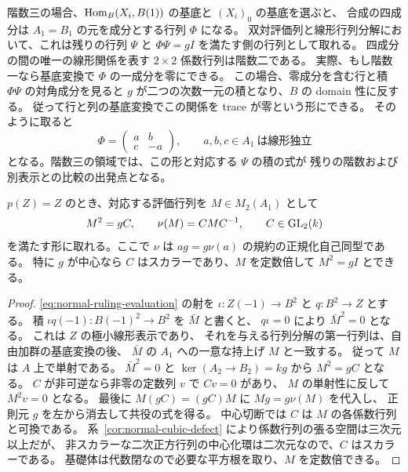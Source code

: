 \begin{remark}[階数三の行列表示]
\label{rem:rank-three-matrix}
階数三の場合、$\operatorname{Hom}_B(X_i,B(1))$ の基底と $(X_i)_0$ の基底を選ぶと、
合成の四成分は $A_1=B_1$ の元を成分とする行列 $\Phi$ になる。
双対評価列と線形行列分解において、これは残りの行列 $\Psi$ と
$\Phi\Psi=gI$ を満たす側の行列として取れる。
四成分の間の唯一の線形関係を表す $2\times2$ 係数行列は階数二である。
実際、もし階数一なら基底変換で $\Phi$ の一成分を零にできる。
この場合、零成分を含む行と積 $\Phi\Psi$ の対角成分を見ると
$g$ が二つの次数一元の積となり、$B$ の domain 性に反する。
従って行と列の基底変換でこの関係を trace が零という形にできる。
そのように取ると
\[
 \Phi=\begin{pmatrix} a&b\\ c&-a\end{pmatrix},
 \qquad a,b,c\in A_1\ \text{は線形独立}
\]
となる。階数三の領域では、この形と対応する $\Psi$ の積の式が
残りの階数および別表示との比較の出発点となる。
\end{remark}

\begin{corollary}
\label{cor:nonstandard-square-matrix}
$p(Z)=Z$ のとき、対応する評価行列を $M\in M_2(A_1)$ として
\[
 M^2=gC,\qquad \nu(M)=CMC^{-1},\qquad C\in\operatorname{GL}_2(k)
\]
を満たす形に取れる。ここで $\nu$ は $ag=g\nu(a)$ の規約の正規化自己同型である。
特に $g$ が中心なら $C$ はスカラーであり、$M$ を定数倍して $M^2=gI$ とできる。
\end{corollary}
\begin{proof}
\eqref{eq:normal-ruling-evaluation} の射を
$\iota:Z(-1)\to B^2$ と $q:B^2\to Z$ とする。
積 $\iota q(-1):B(-1)^2\to B^2$ を $\bar M$ と書くと、
$q\iota=0$ により $\bar M^2=0$ となる。
これは $Z$ の極小線形表示であり、
それを与える行列分解の第一行列は、自由加群の基底変換の後、
$\bar M$ の $A_1$ への一意な持上げ $M$ と一致する。
従って $M$ は $A$ 上で単射である。
$\bar M^2=0$ と $\ker(A_2\to B_2)=kg$ から $M^2=gC$ となる。
$C$ が非可逆なら非零の定数列 $v$ で $Cv=0$ があり、
$M$ の単射性に反して $M^2v=0$ となる。
最後に $M(gC)=(gC)M$ に $Mg=g\nu(M)$ を代入し、
正則元 $g$ を左から消去して共役の式を得る。
中心切断では $C$ は $M$ の各係数行列と可換である。
系~\ref{cor:normal-cubic-defect} により係数行列の張る空間は三次元以上だが、
非スカラーな二次正方行列の中心化環は二次元なので、$C$ はスカラーである。
基礎体は代数閉なので必要な平方根を取り、$M$ を定数倍できる。
\end{proof}
